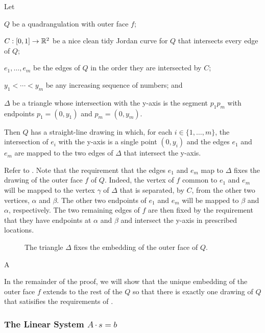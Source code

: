 \documentclass{patmorin}
\begin{document}
\begin{thm}
    Let
    \begin{compactitem}
    \item $Q$ be a quadrangulation with outer face $f$; 
    \item $C:[0,1]\to\mathbb{R}^2$ be a nice clean tidy Jordan curve for $Q$
     that intersects every edge of $Q$;
    \item $e_1,\ldots,e_m$ be the edges of $Q$ in the
    order they are intersected by $C$; 
    \item $y_1<\cdots<y_m$
    be any increasing sequence of numbers; and
    \item $\Delta$ be a triangle whose intersection with the y-axis
     is the segment $p_1p_m$ with endpoints $p_1=(0,y_1)$ and $p_m=(0,y_m)$.
    \end{compactitem}
    Then $Q$ has a straight-line
    drawing in which, for each $i\in\{1,\ldots,m\}$, the intersection
    of $e_i$ with the y-axis is a single point $(0,y_i)$ and the edges
    $e_1$ and $e_m$ are mapped to the two edges of $\Delta$ that
    intersect the y-axis.
\end{thm}

Refer to .
Note that the requirement that the edges $e_1$ and $e_m$ map to $\Delta$
fixes the drawing of the outer face $f$ of $Q$. Indeed, the vertex of
$f$ common to $e_1$ and $e_m$ will be mapped to the vertex $\gamma$ of
$\Delta$ that is separated, by $C$, from the other two vertices, $\alpha$
and $\beta$.  The other two endpoints of $e_1$ and $e_m$ will be mapped
to $\beta$ and $\alpha$, respectively.  The two remaining edges of $f$
are then fixed by the requirement that they have endpoints at $\alpha$
and $\beta$ and intersect the y-axis in prescribed locations.
\begin{figure}
   \caption{The triangle $\Delta$ fixes the embedding of the outer face of $Q$.}
\end{figure}
A


In the remainder of the proof, we will show that the unique embedding of
the outer face $f$ extends to the rest of the $Q$ so that there is exactly
one drawing of $Q$ that satisifies the requirements of .

\subsubsection{The Linear System $A\cdot s=b$}
\end{document}
